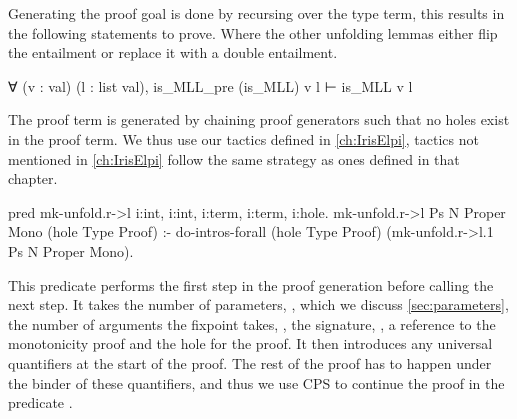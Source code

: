 \documentclass[thesis.tex]{subfiles}
\begin{document}
Generating the proof goal is done by recursing over the type term, this results in the following statements to prove. Where the other unfolding lemmas either flip the entailment or replace it with a double entailment.
\begin{coqcode}
  ∀ (v : val) (l : list val),
      is_MLL_pre (is_MLL) v l 
    ⊢ is_MLL v l
\end{coqcode}

The proof term is generated by chaining proof generators such that no holes exist in the proof term. We thus use our tactics defined in \cref{ch:IrisElpi}, tactics not mentioned in \cref{ch:IrisElpi} follow the same strategy as ones defined in that chapter.
\begin{elpicode}
  pred mk-unfold.r->l i:int, i:int, 
                      i:term, i:term, i:hole.
  mk-unfold.r->l Ps N Proper Mono (hole Type Proof) :-
    do-intros-forall (hole Type Proof) 
                     (mk-unfold.r->l.1 Ps N Proper Mono).
\end{elpicode}
This predicate performs the first step in the proof generation before calling the next step. It takes the number of parameters, , which we discuss \cref{sec:parameters}, the number of arguments the fixpoint takes, , the  signature, , a reference to the monotonicity proof  and the hole for the proof. It then introduces any universal quantifiers at the start of the proof. The rest of the proof has to happen under the binder of these quantifiers, and thus we use CPS to continue the proof in the predicate .
\end{document}
